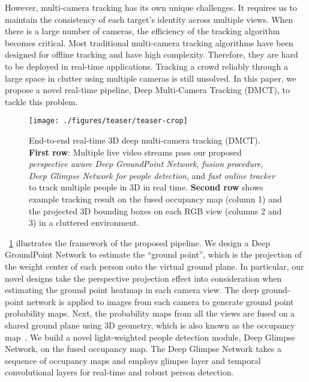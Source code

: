 \documentclass{article}
\begin{document}
However, multi-camera tracking has its own unique challenges. It requires us to maintain
the consistency of each target's identity across multiple views.
When there is a large number of cameras, the efficiency of the tracking algorithm becomes critical.
Most traditional multi-camera tracking algorithms have been designed for offline tracking and have high complexity.
Therefore, they are hard to be deployed in real-time applications.
Tracking a crowd reliably through a large space in clutter using multiple cameras 
is still unsolved.
In this paper, we propose a novel real-time pipeline, Deep Multi-Camera Tracking (DMCT),
to tackle this problem.

\begin{figure}[!tbp]
	\begin{center}
		\texttt{[image: ./figures/teaser/teaser-crop]}
	\end{center}
	\caption{End-to-end real-time 3D deep multi-camera tracking (DMCT). \textbf{First row}:
   Multiple live video streams pass our proposed \textit{perspective aware Deep GroundPoint Network},
	 \textit{fusion procedure}, \textit{Deep Glimpse Network for people detection}, and \textit{fast online tracker}
	 to track multiple people in 3D in real time.
	  \textbf{Second row} shows example tracking result on the fused occupancy map (column 1) and the projected 3D bounding boxes on each RGB view (columns 2 and 3) in a cluttered environment.}
	\label{fig:pipeline}
\end{figure}


\figurename~\ref{fig:pipeline} illustrates the framework of the proposed pipeline.
We design a Deep GroundPoint Network to estimate the ``ground point'', 
which is the projection of the weight center of each person onto the virtual ground plane.
In particular, our novel designs take the perspective projection effect into consideration when estimating the ground point heatmap in each camera view. 
The deep ground-point network is applied to images from each camera to generate ground point probability maps.     
Next, the probability maps from all the views are fused on a shared ground plane using 3D geometry, which is
also known as the occupancy map~\cite{epfl1}. We build a novel 
light-weighted people detection module, Deep Glimpse Network, on the fused occupancy map.
The Deep Glimpse Network  takes a sequence of occupancy maps and employs glim\textit{}pse layer and 
temporal convolutional layers for real-time and robust person detection. 
\end{document}
